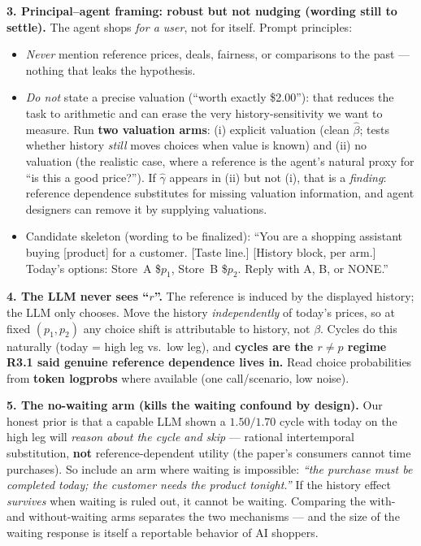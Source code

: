 \documentclass[11pt]{article}
\newcommand{\crit}[1]{\textcolor{crit}{\textbf{#1}}}
\newcommand{\med}[1]{\textcolor{med}{#1}}
\begin{document}
\smallskip
\textbf{3. Principal--agent framing: robust but not nudging (\med{wording still to settle}).} The agent
shops \emph{for a user}, not for itself. Prompt principles:
\begin{itemize}\setlength\itemsep{1pt}
  \item \emph{Never} mention reference prices, deals, fairness, or comparisons to the past --- nothing that
        leaks the hypothesis.
  \item \emph{Do not} state a precise valuation (``worth exactly \$2.00''): that reduces the task to
        arithmetic and can erase the very history-sensitivity we want to measure. Run \textbf{two valuation
        arms}: (i) explicit valuation (clean $\hat\beta$; tests whether history \emph{still} moves choices
        when value is known) and (ii) no valuation (the realistic case, where a reference is the agent's
        natural proxy for ``is this a good price?''). If $\hat\gamma$ appears in (ii) but not (i), that is a
        \emph{finding}: reference dependence substitutes for missing valuation information, and agent
        designers can remove it by supplying valuations.
  \item Candidate skeleton (wording to be finalized): ``You are a shopping assistant buying [product] for a
        customer. [Taste line.] [History block, per arm.] Today's options: Store~A \$$p_1$, Store~B
        \$$p_2$. Reply with A, B, or NONE.''
\end{itemize}

\smallskip
\textbf{4. The LLM never sees ``$r$''.} The reference is induced by the displayed history; the LLM only
chooses. Move the history \emph{independently} of today's prices, so at fixed $(p_1,p_2)$ any choice shift
is attributable to history, not $\beta$. Cycles do this naturally (today = high leg vs.\ low leg), and
\crit{cycles are the $r\neq p$ regime R3.1 said genuine reference dependence lives in.} Read choice
probabilities from \textbf{token logprobs} where available (one call/scenario, low noise).

\smallskip
\textbf{5. The no-waiting arm (kills the waiting confound by design).} Our honest prior is that a capable
LLM shown a $1.50/1.70$ cycle with today on the high leg will \emph{reason about the cycle and skip} ---
rational intertemporal substitution, \textbf{not} reference-dependent utility (the paper's consumers cannot
time purchases). So include an arm where waiting is impossible: \emph{``the purchase must be completed
today; the customer needs the product tonight.''} If the history effect \emph{survives} when waiting is
ruled out, it cannot be waiting. Comparing the with- and without-waiting arms separates the two mechanisms
--- and the size of the waiting response is itself a reportable behavior of AI shoppers.
\end{document}
